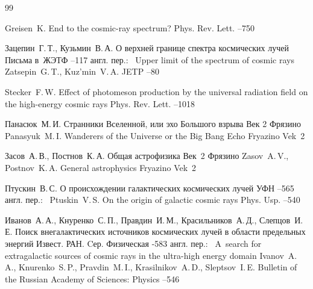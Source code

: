 \begin{thebibliography}{99}

\by Greisen~K.
\paper End to the cosmic-ray spectrum?
\jour Phys. Rev. Lett. 
--750

\by Зацепин~Г.\,Т., Кузьмин~В.\,А.
\paper О верхней границе спектра космических лучей
\jour Письма в~ЖЭТФ
--117
\transl англ. пер.:~
\paper Upper limit of the spectrum of cosmic rays
\by Zatsepin~G.\,T., Kuz'min~V.\,A.
\jour JETP
--80

\by Stecker~F.\,W.
\paper Effect of photomeson production by the universal radiation field on the high-energy cosmic rays
\jour Phys. Rev. Lett. 
--1018

\by Панасюк~М.\,И.
\book Странники Вселенной, или эхо Большого  взрыва
\publ Век 2
\publaddr Фрязино
\misctransl
\by Panasyuk~M.\,I.
\book Wanderers of the Universe or the Big Bang Echo
\publaddr Fryazino
\publ Vek~2

\by Засов~А.\,В., Постнов~К.\,А.
\book Общая астрофизика
\publ Век~2
\publaddr Фрязино
\misctransl
\by Zasov~A.\,V., Postnov~K.\,A.
\book General astrophysics 
\publaddr Fryazino
\publ Vek~2

\by Птускин~В.\,С.
\paper О происхождении галактических космических лучей
\jour УФН
--565
\transl англ. пер.:~
\by Ptuskin~V.\,S. 
\paper On the origin of galactic cosmic rays
\jour Phys. Usp. 
–540 


\by Иванов~А.\,А., Кнуренко~С.\,П., Правдин~И.\,М., Красильников~А.\,Д., Слепцов~И.\,Е.
\paper Поиск внегалактических источников космических лучей в области предельных энергий
\jour Извест. РАН. Cер. Физическая
-583
\transl англ. пер.:~
\paper A~search for extragalactic sources of cosmic rays in the ultra-high energy domain
\by Ivanov~A.\,A., Knurenko~S.\,P., Pravdin~M.\,I., Krasilnikov~A.\,D., Sleptsov~I.\,E.
\jour Bulletin of the Russian Academy of Sciences: Physics
--546


\end{thebibliography}
